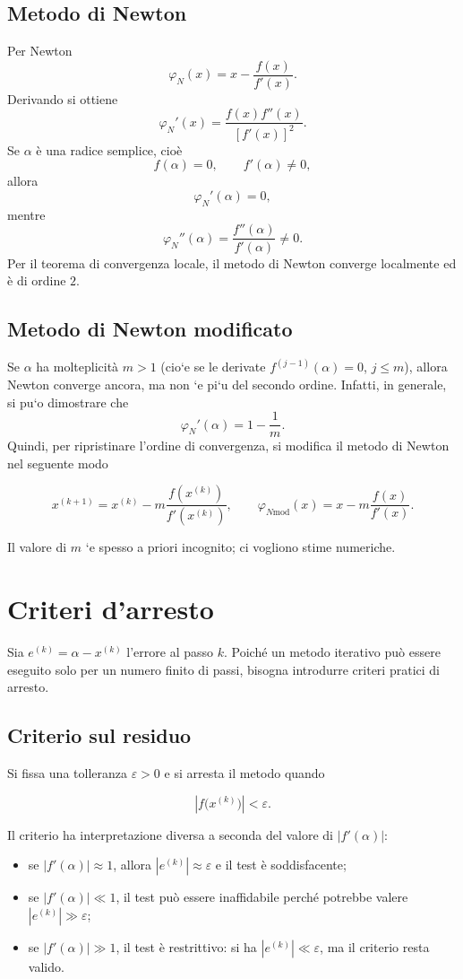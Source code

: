 \documentclass[11pt,a4paper]{report}
\begin{document}
\subsection{Metodo di Newton}
Per Newton
\[
 \varphi_N(x)=x-\frac{f(x)}{f'(x)}.
\]
Derivando si ottiene
\[
 \varphi_N'(x)=\frac{f(x)f''(x)}{[f'(x)]^2}.
\]
Se $\alpha$ \`e una radice semplice, cio\`e
\[
 f(\alpha)=0,
 \qquad
 f'(\alpha)\neq 0,
\]
allora
\[
 \varphi_N'(\alpha)=0,
\]
mentre
\[
 \varphi_N''(\alpha)=\frac{f''(\alpha)}{f'(\alpha)}\neq 0.
\]
Per il teorema di convergenza locale, il metodo di Newton converge localmente ed \`e di ordine $2$.

\subsection{Metodo di Newton modificato}
Se $\alpha$ ha molteplicit\`a $m>1$ (cio`e se le derivate $f^{(j-1)}(\alpha)=0$, $j\le m$), allora Newton converge ancora, ma non `e pi`u del secondo ordine. Infatti, in generale, si pu`o dimostrare che
\[
 \varphi_N'(\alpha)=1-\frac{1}{m}.
\]
Quindi, per ripristinare l'ordine di convergenza, si modifica il metodo di Newton nel seguente modo
\begin{formulaBox}
\[
 x^{(k+1)}=x^{(k)}-m\frac{f(x^{(k)})}{f'(x^{(k)})},
 \qquad
 \varphi_{N\mathrm{mod}}(x)=x-m\frac{f(x)}{f'(x)}.
\]
\end{formulaBox}
Il valore di $m$ `e spesso a priori incognito; ci vogliono stime numeriche.


\section{Criteri d'arresto}
Sia $e^{(k)}=\alpha-x^{(k)}$ l'errore al passo $k$.
Poich\'e un metodo iterativo pu\`o essere eseguito solo per un numero finito di passi, bisogna introdurre criteri pratici di arresto.

\subsection{Criterio sul residuo}
Si fissa una tolleranza $\varepsilon>0$ e si arresta il metodo quando
\begin{formulaBox}
\[
 |f\bigl(x^{(k)}\bigr)|<\varepsilon.
\]
\end{formulaBox}
Il criterio ha interpretazione diversa a seconda del valore di $|f'(\alpha)|$:
\begin{itemize}
  \item se $|f'(\alpha)|\approx 1$, allora $|e^{(k)}|\approx \varepsilon$ e il test \`e soddisfacente;
  \item se $|f'(\alpha)|\ll 1$, il test pu\`o essere inaffidabile perch\'e potrebbe valere $|e^{(k)}|\gg \varepsilon$;
  \item se $|f'(\alpha)|\gg 1$, il test \`e restrittivo: si ha $|e^{(k)}|\ll \varepsilon$, ma il criterio resta valido.
\end{itemize}
\end{document}
